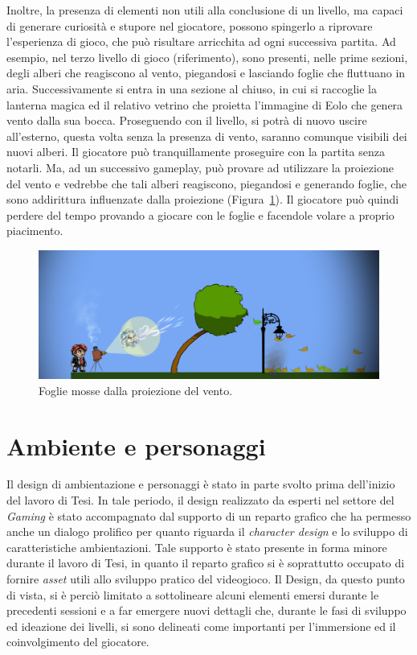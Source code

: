Inoltre, la presenza di elementi non utili alla conclusione di un livello, ma capaci di generare curiosità e stupore nel giocatore, possono spingerlo a riprovare l’esperienza di gioco, che può risultare arricchita ad ogni successiva partita.
Ad esempio, nel terzo livello di gioco (riferimento), sono presenti, nelle prime sezioni, degli alberi che reagiscono al vento, piegandosi e lasciando foglie che fluttuano in aria. Successivamente si entra in una sezione al chiuso, in cui si raccoglie la lanterna magica ed il relativo vetrino che proietta l’immagine di Eolo che genera vento dalla sua bocca. Proseguendo con il livello, si potrà di nuovo uscire all’esterno, questa volta senza la presenza di vento, saranno comunque visibili dei nuovi alberi. Il giocatore può tranquillamente proseguire con la partita senza notarli. Ma, ad un successivo gameplay, può provare ad utilizzare la proiezione del vento e vedrebbe che tali alberi reagiscono, piegandosi e generando foglie, che sono addirittura influenzate dalla proiezione (Figura~\ref{fig:rigiocabilita_foglie}). Il giocatore può quindi perdere del tempo provando a giocare con le foglie e facendole volare a proprio piacimento.

\begin{figure}%
	\centering
	\includegraphics[width= 0.9\columnwidth]{images/gameDesign/27_foglie.jpg}
	\caption{Foglie mosse dalla proiezione del vento.}
	\label{fig:rigiocabilita_foglie}
\end{figure} 

\section{Ambiente e personaggi}
\label{sec:ambiente_personaggi}

Il design di ambientazione e personaggi è stato in parte svolto prima dell’inizio del lavoro di Tesi. In tale periodo, il design realizzato da esperti nel settore del \textit{Gaming} è stato accompagnato dal supporto di un reparto grafico che ha permesso anche un dialogo prolifico per quanto riguarda il \textit{character design} e lo sviluppo di caratteristiche ambientazioni. Tale supporto è stato presente in forma minore durante il lavoro di Tesi, in quanto il reparto grafico si è soprattutto occupato di fornire \textit{asset} utili allo sviluppo pratico del videogioco. Il Design, da questo punto di vista, si è perciò limitato a sottolineare alcuni elementi emersi durante le precedenti sessioni e a far emergere nuovi dettagli che, durante le fasi di sviluppo ed ideazione dei livelli, si sono delineati come importanti per l’immersione ed il coinvolgimento del giocatore.

